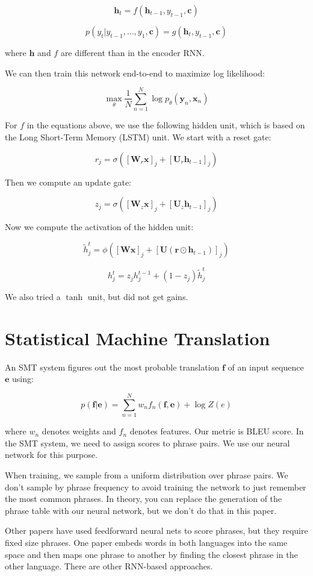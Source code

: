 \documentclass[a4paper]{article}
\begin{document}
$$
\mathbf{h}_t = f(\mathbf{h}_{t-1}, y_{t-1}, \mathbf{c})
$$

$$
p(y_t | y_{t-1}, ..., y_1, \mathbf{c}) = g(\mathbf{h}_t, y_{t-1}, \mathbf{c})
$$

where $\mathbf{h}$ and $f$ are different than in the encoder RNN.

We can then train this network end-to-end to maximize log likelihood:

$$
\max_{\theta}{\frac{1}{N} \sum_{n=1}^{N}{\log{p_{\theta}(
\mathbf{y}_n, \mathbf{x}_n
)}}}
$$

For $f$ in the equations above, we use the following hidden unit, which is based
on the Long Short-Term Memory (LSTM) unit. We start with a reset gate:

$$
r_j = \sigma([\mathbf{W}_r \mathbf{x}]_j + [\mathbf{U}_r \mathbf{h}_{t-1}]_j)
$$

Then we compute an update gate:

$$
z_j = \sigma([\mathbf{W}_z \mathbf{x}]_j + [\mathbf{U}_z \mathbf{h}_{t-1}]_j)
$$

Now we compute the activation of the hidden unit:

$$
\tilde{h}_j^t = \phi([\mathbf{W} \mathbf{x}]_j + [\mathbf{U}(
\mathbf{r} \odot \mathbf{h}_{t-1}
)]_j)
$$

$$
h_j^t = z_j h_j^{t-1} + (1 - z_j) \tilde{h}_j^{t}
$$

We also tried a $\tanh$ unit, but did not get gains.

\section{Statistical Machine Translation}
An SMT system figures out the most probable translation $\mathbf{f}$ of an input
sequence $\mathbf{e}$ using:

$$
p(\mathbf{f} | \mathbf{e}) = \sum_{n=1}^{N}{w_n f_n(\mathbf{f}, \mathbf{e})
+ \log{Z(e)}}
$$

where $w_n$ denotes weights and $f_n$ denotes features. Our metric is BLEU
score. In the SMT system, we need to assign scores to phrase pairs. We use
our neural network for this purpose.

When training, we sample from a uniform distribution over phrase pairs. We
don't sample by phrase frequency to avoid training the network to just remember
the most common phrases. In theory, you can replace the generation of
the phrase table with our neural network, but we don't do that in this
paper.

Other papers have used feedforward neural nets to score phrases, but they
require fixed size phrases. One paper embeds words in both languages into
the same space and then maps one phrase to another by finding the closest
phrase in the other language. There are other RNN-based approaches.
\end{document}
